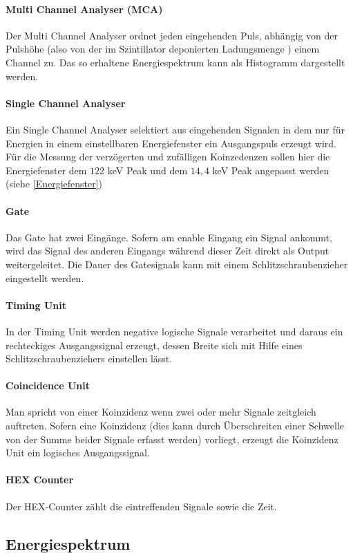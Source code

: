 \documentclass[12pt,listof=totoc]{scrartcl}
\begin{document}
 \paragraph{Multi Channel Analyser (MCA)}
 Der Multi Channel Analyser ordnet jeden eingehenden Puls, abhängig von der Pulshöhe (also von der im Szintillator deponierten Ladungsmenge ) einem Channel zu. Das so erhaltene Energiespektrum kann als Histogramm dargestellt werden.
 \paragraph{Single Channel Analyser}
 Ein Single Channel Analyser selektiert aus eingehenden Signalen in dem nur für Energien in einem einstellbaren Energiefenster ein Ausgangspuls erzeugt wird.  Für die Messung der verzögerten und zufälligen Koinzedenzen sollen hier die Energiefenster dem $122$ keV Peak und dem $14,4$ keV Peak angepasst werden (siehe \ref{Energiefenster})
 \paragraph{Gate} Das Gate hat zwei Eingänge. Sofern am enable Eingang ein Signal ankommt, wird das Signal des anderen Eingangs während dieser Zeit direkt als Output weitergeleitet. Die Dauer des Gatesignals kann mit einem Schlitzschraubenzieher eingestellt werden.
 \paragraph{Timing Unit}
 In der Timing Unit werden negative logische Signale verarbeitet und daraus ein rechteckiges Ausgangssignal erzeugt, dessen Breite sich mit Hilfe eines Schlitzschraubenziehers einstellen lässt.
 \paragraph{Coincidence Unit}
 Man spricht von einer Koinzidenz wenn zwei oder mehr Signale zeitgleich auftreten. Sofern eine Koinzidenz (dies kann durch Überschreiten einer Schwelle von der Summe beider Signale erfasst werden) vorliegt, erzeugt die Koinzidenz Unit ein logisches Ausgangssignal.
 \paragraph{HEX Counter}
Der HEX-Counter zählt die eintreffenden Signale sowie die Zeit.

\subsection{Energiespektrum}
\end{document}
